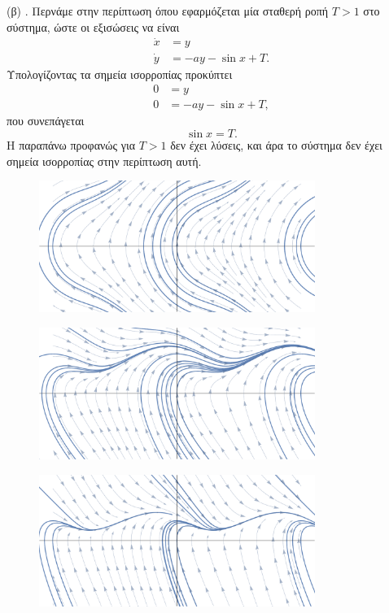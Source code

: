 \begin{solution}
    (β) . Περνάμε στην περίπτωση όπου εφαρμόζεται μία σταθερή ροπή
    \( T > 1\) στο σύστημα, ώστε οι εξισώσεις να είναι
    \begin{align*}
        \dot{x} &= y \\
        \dot{y} &= -a y - \sin{x} + T.
    \end{align*}
    Υπολογίζοντας τα σημεία ισορροπίας προκύπτει
    \begin{align*}
        0 &= y \\
        0 &= -a y - \sin{x} + T,
    \end{align*}
    που συνεπάγεται
    \[
        \sin{x} = T.
    \]
    Η παραπάνω προφανώς για \( T > 1 \) δεν έχει λύσεις, και άρα το σύστημα δεν
    έχει σημεία ισορροπίας στην περίπτωση αυτή.
    \begin{figure}[h!]
        \centering
        \includegraphics[width=0.8\textwidth]{figures/ex4_torque2Comb.pdf}
        \caption{}
        \label{fig:ex4_torque2Comb}
    \end{figure}
    \begin{figure}[h!]
        \centering
        \includegraphics[width=0.8\textwidth]{figures/ex4_torque2damped1Comb.pdf}
        \caption{}
        \label{fig:ex4_torque2damped1Comb}
    \end{figure}
    \begin{figure}[h!]
        \centering
        \includegraphics[width=0.8\textwidth]{figures/ex4_torque2damped2Comb.pdf}
        \caption{}
        \label{fig:ex4_torque2damped2Comb}
    \end{figure}


\end{solution}
